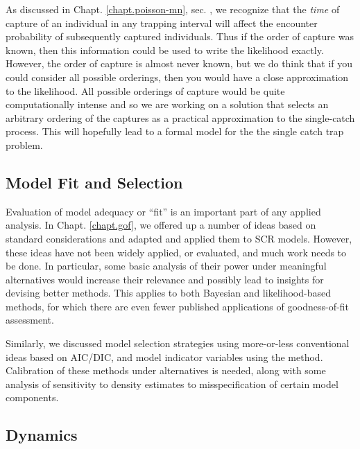As discussed in Chapt. \ref{chapt.poisson-mn}, 
sec. \label{poisson-mn.sec.singlecatch},
we recognize that the {\it time} of capture of an
individual in any trapping interval will affect the encounter
probability of subsequently captured individuals. Thus if 
the order of capture was known, then this information could be 
used to write the likelihood exactly. However, the order of capture
is almost never known, but we do think that if you could consider all
possible orderings, then you would have a close approximation to the
likelihood. All possible orderings of capture would be quite
computationally intense and so we are working on a solution that selects
an arbitrary ordering of the captures as a practical approximation to the
single-catch process. This will hopefully lead to a formal model
for the the single catch trap problem.


\subsection{Model Fit and Selection}

Evaluation of model adequacy or ``fit'' is an important part of any
applied analysis. In Chapt. \ref{chapt.gof}, we offered up a number of
ideas based on standard considerations and adapted and applied them
to SCR models. However, these ideas have not been widely applied, or
evaluated, and much work needs to be done. In particular, some basic
analysis of their power under meaningful alternatives would increase
their relevance and possibly lead to insights for devising better
methods. This applies to both Bayesian and likelihood-based methods,
for which there are even fewer published applications of
goodness-of-fit assessment.

Similarly, we discussed model selection strategies using more-or-less
conventional ideas based on AIC/DIC, and model indicator variables
using the \citet{kuo_mallick:1998} method. Calibration of these
methods under alternatives is needed, along with some analysis of
sensitivity to density estimates to misspecification of certain model
components.


\subsection{Dynamics}


